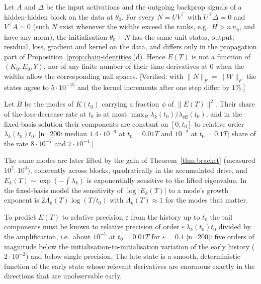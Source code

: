 \begin{theorem}
\label{thm:hidden}
Let $A$ and $\Delta$ be the input activations and the outgoing backprop
signals of a hidden-hidden block on the data at $\theta_0$. For every
$N=UV^{\!\top}$ with $U^{\!\top}\Delta=0$ and $V^{\!\top}A=0$ (such $N$ exist whenever the
widths exceed the ranks, e.g.\ $H>n\,n_y$, and have any norm), the
initialisation $\theta_0+N$ has the same unit states, output, residual, loss,
gradient and kernel on the data, and differs only in the propagation part of
Proposition~\ref{prop:chain-identities}(d). Hence $E(T)$ is not a function of
$(K_0,E_0,Y)$, nor of any finite number of their time derivatives at $0$ when
the widths allow the corresponding null spaces. [Verified: with
$\|N\|_F=\|W\|_F$ the states agree to $5\cdot10^{-15}$ and the kernel increments
after one step differ by $1\%$.]
\end{theorem}

\begin{proposition}[Visibility]
\label{prop:visibility}
Let $B$ be the modes of $K(t_0)$ carrying a fraction $\phi$ of $\|E(T)\|^2$. Their
share of the loss-decrease rate at $t_0$ is at most
$\max_B\lambda_k(t_0)/\lambda_{\mathrm{eff}}(t_0)$, and in the fixed-basis
solution their components are constant on $[0,t_0]$ to relative order
$\lambda_k(t_0)t_0$. [n=200: median $1.4\cdot10^{-6}$ at $t_0=0.01T$ and
$10^{-2}$ at $t_0=0.1T$; share of the rate $8\cdot10^{-7}$ and $7\cdot10^{-4}$.]
\end{proposition}

\begin{proposition}[Amplification]
\label{prop:amplification}
The same modes are later lifted by the gain of
Theorem~\ref{thm:bracket} (measured $10^2$--$10^4$), coherently across blocks,
quadratically in the accumulated drive, and $E_k(T)\sim\exp(-\!\int\lambda_k)$ is
exponentially sensitive to the lifted eigenvalue. In the fixed-basis model the
sensitivity of $\log|E_k(T)|$ to a mode's growth exponent is
$2\Lambda_k(T)\log(T/t_0)$ with $\Lambda_k(T)\approx1$ for the modes that
matter.
\end{proposition}

\begin{corollary}
\label{cor:conditioning}
To predict $E(T)$ to relative precision $\varepsilon$ from the history up to
$t_0$ the tail components must be known to relative precision of order
$\varepsilon\,\lambda_k(t_0)t_0$ divided by the amplification, i.e.\ about
$10^{-7}$ at $t_0=0.01T$ for $\varepsilon=0.1$ [n=200]: five orders of magnitude
below the initialisation-to-initialisation variation of the early history
($2\cdot10^{-2}$) and below single precision. The late state is a smooth,
deterministic function of the early state whose relevant derivatives are
enormous exactly in the directions that are unobservable early.
\end{corollary}

